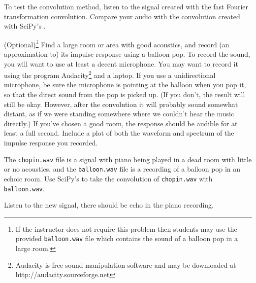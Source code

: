 To test the convolution method, listen to the signal created with the fast Fourier transformation convolution. 
Compare your audio with the convolution created with SciPy's .  

(Optional)\footnote{If the instructor does not require this problem then students may use the provided \texttt{balloon.wav} file which contains the sound of a balloon pop in a large room.} Find a large room or area with good acoustics, and record (an approximation to) its impulse response using a balloon pop.
To record the sound, you will want to use at least a decent microphone.
You may want to record it using the program Audacity\footnote{Audacity is free sound manipulation software and may be downloaded at http://audacity.sourceforge.net} and a laptop.
If you use a unidirectional microphone, be sure the microphone is pointing at the balloon when you pop it, so that the direct sound from the pop is picked up.
(If you don't, the result will still be okay.
However, after the convolution it will probably sound somewhat distant, as if we were standing somewhere where we couldn't hear the music directly.)
If you've chosen a good room, the response should be audible for at least a full second.
Include a plot of both the waveform and spectrum of the impulse response you recorded.

The \texttt{chopin.wav} file is a signal with piano being played in a dead room with little or no acoustics, and the \texttt{balloon.wav} file is a recording of a balloon pop in an echoic room. 
Use SciPy's  to take the convolution of \texttt{chopin.wav} with \texttt{balloon.wav}.

Listen to the new signal, there should be echo in the piano recording. 
\begin{comment}
To summarize:
\begin{enumerate}
\item Read in \texttt{chopin.wav} and the impulse response with \li{wavfile},
\item Add several seconds of silence to the signal from \texttt{chopin.wav},
\item Insert zeros into the middle of the impulse response transform so that it is the same length as  \texttt{chopin.wav},
\item Calculate the convolution of the signals,
\item And finally, calculate the inverse Fourier transform.
\end{enumerate}
\end{comment}

